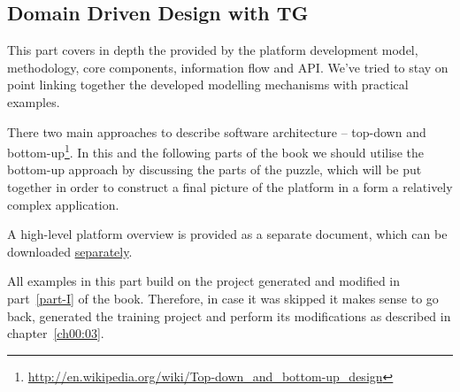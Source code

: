 \begin{partbacktext}
\part{Domain Driven Design with TG}  
  This part covers in depth the provided by the platform development model, methodology, core components, information flow and API.
  We've tried to stay on point linking together the developed modelling mechanisms with practical examples.
  
  There two main approaches to describe software architecture -- top-down and bottom-up\footnote{\url{http://en.wikipedia.org/wiki/Top-down_and_bottom-up_design}}.
  In this and the following parts of the book we should utilise the bottom-up approach by discussing the parts of the puzzle, which will be put together in order to construct a final picture of the platform in a form a relatively complex application.

  A high-level platform overview is provided as a separate document, which can be downloaded \href{http://www.fielden.com.ua/trac/pnl-tg/attachment/wiki/WikiStart/architecture-overview.pdf}{separately}.

  All examples in this part build on the project generated and modified in part~\ref{part-I} of the book.
  Therefore, in case it was skipped it makes sense to go back, generated the training project and perform its modifications as described in chapter~\ref{ch00:03}.
\end{partbacktext}
